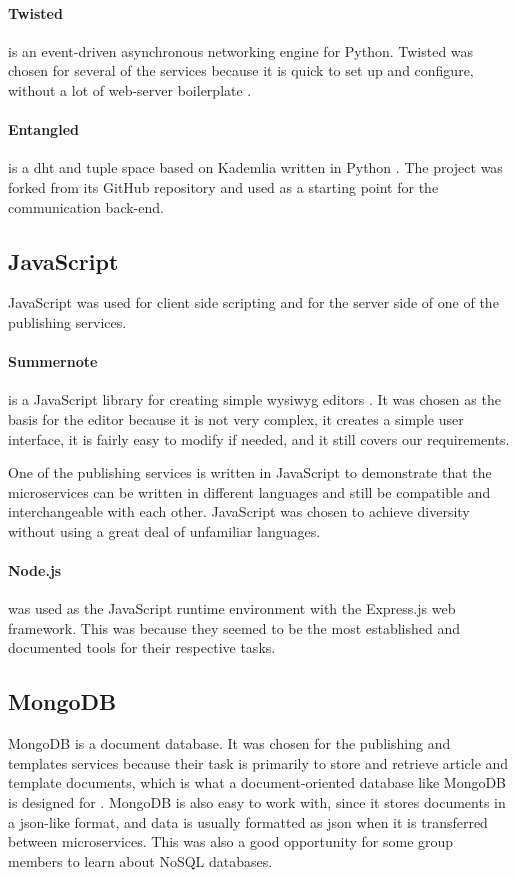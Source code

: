 \paragraph{Twisted} is an event-driven asynchronous networking engine for Python. Twisted was chosen for several of the services because it is quick to set up and configure, without a lot of web-server boilerplate \citep{twisted}.

\paragraph{Entangled} is a \acrshort{dht} and tuple space based on Kademlia written in Python \citep{entangled}. The project was forked from its GitHub repository and used as a starting point for the communication back-end.

\subsection{JavaScript}
JavaScript was used for client side scripting and for the server side of one of the publishing services.

\paragraph{Summernote} is a JavaScript library for creating simple \acrshort{wysiwyg} editors \citep{summernote}. It was chosen as the basis for the editor because it is not very complex, it creates a simple user interface, it is fairly easy to modify if needed, and it still covers our requirements.

One of the publishing services is written in JavaScript to demonstrate that the microservices can be written in different languages and still be compatible and interchangeable with each other. JavaScript was chosen to achieve diversity without using a great deal of unfamiliar languages.

\paragraph{Node.js} was used as the JavaScript runtime environment with the Express.js web framework. This was because they seemed to be the most established and documented tools for their respective tasks.

\subsection{MongoDB}
MongoDB is a document database. It was chosen for the publishing and templates services because their task is primarily to store and retrieve article and template documents, which is what a document-oriented database like MongoDB is designed for \citep{MongoDB}. MongoDB is also easy to work with, since it stores documents in a \acrshort{json}-like format, and data is usually formatted as \acrshort{json} when it is transferred between microservices. This was also a good opportunity for some group members to learn about NoSQL databases.


